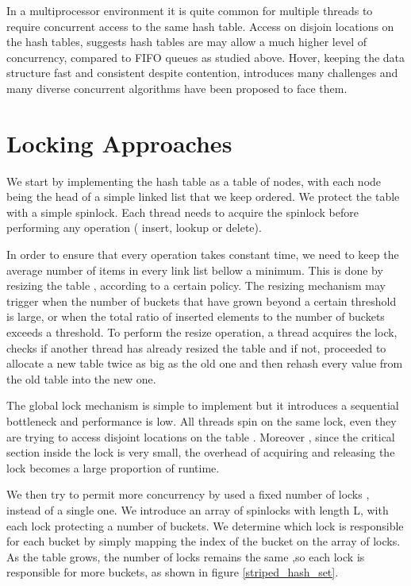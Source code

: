 In a multiprocessor environment it is quite common for multiple threads to require concurrent access to the same hash table. Access on disjoin locations on the hash tables, suggests hash tables are may allow a much higher level of concurrency, compared to FIFO queues as studied above. Hover, keeping the data structure fast and consistent despite contention, introduces many challenges and many diverse concurrent algorithms have been proposed to face them.
   

\section{ Locking  Approaches}

We start by implementing the hash table as a table of nodes, with each node being the head of a simple linked list that we keep ordered. We protect the table with a simple spinlock. Each thread needs to acquire the spinlock before performing any operation ( insert, lookup or delete). 

In order to ensure that every operation takes constant time, we need to keep the average number of items in every link list bellow a minimum. This is done by resizing the table , according to a certain policy. The resizing mechanism may trigger when the number of buckets that have grown beyond a certain threshold is large, or when the total ratio of inserted elements to the number of buckets exceeds a threshold. To perform the resize operation, a thread acquires the lock, checks if another thread has already resized the table and if not, proceeded to allocate a new table twice as big as the old one and then rehash every value from the old table into the new one.

The global lock mechanism is simple to implement but it introduces a sequential bottleneck and performance is low. All threads spin on the same lock, even they are trying to access disjoint locations on the table . Moreover , since the critical section inside the lock is very small, the overhead of acquiring and releasing the lock becomes a large proportion of runtime.

We then try to permit more concurrency by used a fixed number of locks , instead of a single one. We introduce an array of spinlocks with length L, with each lock protecting a number of buckets. We determine which lock is responsible for each bucket by simply mapping the index of the bucket on the array of locks. As the table grows, the number of locks remains the same ,so each lock is responsible for more buckets, as shown in figure \ref{striped_hash_set}.

